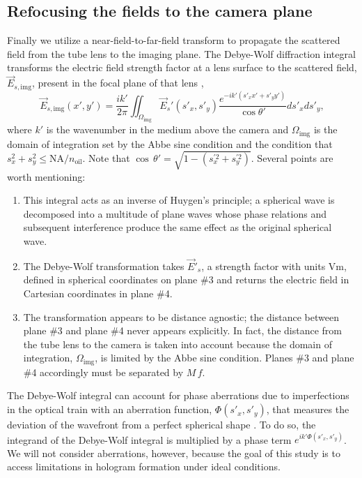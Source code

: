 \subsection{Refocusing the fields to the camera plane}
Finally we utilize a near-field-to-far-field transform to propagate the scattered
field from the tube lens to the imaging plane.
The Debye-Wolf diffraction integral transforms the electric field strength factor at a lens
surface to the scattered field, $\vec{E}_{s,\text{img}}$, present in the focal plane of that
lens \cite{wolf1959},
\begin{equation}
  \vec{E}_{s,\text{img}}(x', y') = \frac{i k'}{2 \pi} \iint_{\Omega_{\text{img}}} \vec{E}_s'(s'_x, s'_y) \frac{e^{-ik'(s'_xx'+s'_yy')}}{\cos{\theta'}}ds'_xds'_y ,
  \label{eq:debyewolf}
\end{equation}
where $k'$ is the wavenumber in the medium above the camera and $\Omega_{\text{img}}$
is the domain of integration set by the Abbe sine condition and the condition
that $s_x^2+s_y^2 \le \text{NA}/n_{\text{oil}}$. Note that $\cos \, \theta' = \sqrt{ 1 - (s_x^{\prime 2} + s_y^{\prime 2} )}$. Several points are worth mentioning:
\begin{enumerate}
\item This integral acts as an inverse of Huygen's principle; a spherical wave is
  decomposed into a multitude of plane waves whose phase relations and subsequent
  interference produce the same effect as the original spherical wave.
\item The Debye-Wolf transformation takes $\vec{E}'_s$, a strength factor with units
  $\si{\volt\meter}$, defined in spherical coordinates on plane \#\num{3} and
  returns the electric field in Cartesian coordinates in plane \#\num{4}.
\item The transformation appears to be distance agnostic; the distance
  between plane \#\num{3} and plane \#\num{4} never appears explicitly.
  In fact, the distance from the tube lens to the camera is taken into
  account because the domain
  of integration, $\Omega_{\text{img}}$, is limited by the Abbe sine condition.
  Planes \#\num{3} and plane \#\num{4} accordingly must be separated by $M \, f$.
\end{enumerate}

The Debye-Wolf integral can account for phase aberrations
due to imperfections in the optical train with an aberration function, $\Phi(s'_x,s'_y)$,
that measures the deviation of the wavefront from a perfect spherical shape \cite{wolf1959}.
To do so, the integrand of the Debye-Wolf integral is multiplied by a phase term
$e^{ik'\Phi(s'_x,s'_y)}$. We will not consider aberrations, however, because
the goal of this study is to access limitations in hologram formation
under ideal conditions.

